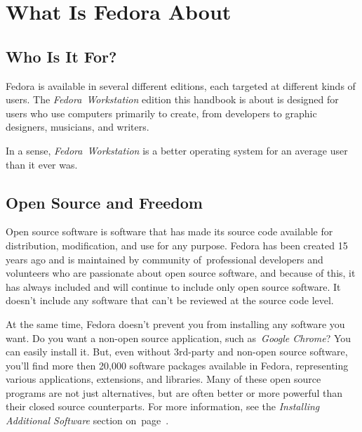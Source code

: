 \chapter*{What Is Fedora About}
\section*{Who Is It For?}

Fedora is available in several different editions, each targeted at different kinds of users. The \emph{Fedora~Workstation} edition this handbook is about is designed for users who use computers primarily to create, from developers to graphic designers, musicians, and writers.


In a sense, \emph{Fedora~Workstation} is a better operating system for an average user than it ever was.

\section*{Open Source and Freedom}

Open source software is software that has made its source code available for distribution, modification, and use for any purpose. Fedora has been created 15 years ago and is maintained by community of~professional developers and volunteers who are passionate about open source software, and because of this, it has always included and will continue to include only open source software. It doesn’t include any software that can’t be reviewed at the source code level.

At the same time, Fedora doesn't prevent you from installing any software you want. Do you want a non-open source application, such as~\emph{Google Chrome}? You can easily install it. But, even without 3rd-party and non-open source software, you'll find more then 20,000 software packages available in Fedora, representing various applications, extensions, and libraries. Many of these open source programs are not just alternatives, but are often better or more powerful than their closed source counterparts. For more information, see the \emph{Installing Additional Software} section on~page~\pageref{installing_additional_software}.


